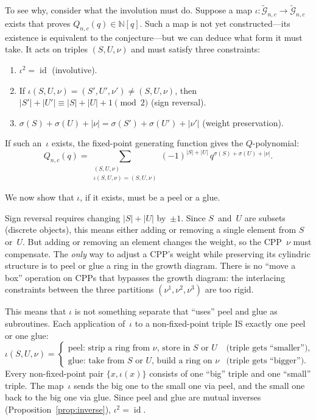 \documentclass[11pt]{article}
\newcommand{\N}{\mathbb{N}}
\theoremstyle{plain}
\theoremstyle{definition}
\begin{document}
To see why, consider what the involution must do.  Suppose a map
$\iota\colon \widetilde{\mathcal{G}}_{n,c} \to
\widetilde{\mathcal{G}}_{n,c}$ exists that proves
$Q_{n,c}(q) \in \N[q]$.  Such a map is not yet constructed---its
existence is equivalent to the conjecture---but we can deduce what
form it must take.  It acts on triples $(S, U, \nu)$ and must
satisfy three constraints:
\begin{enumerate}
  \item $\iota^2 = \operatorname{id}$ (involutive).
  \item If $\iota(S, U, \nu) = (S', U', \nu') \neq (S, U, \nu)$,
    then $|S'| + |U'| \equiv |S| + |U| + 1 \pmod{2}$
    (sign reversal).
  \item $\sigma(S) + \sigma(U) + |\nu|
    = \sigma(S') + \sigma(U') + |\nu'|$
    (weight preservation).
\end{enumerate}
If such an~$\iota$ exists, the fixed-point generating function
gives the $Q$-polynomial:
\begin{equation}\label{eq:fixed-points}
  Q_{n,c}(q) = \sum_{\substack{(S,U,\nu) \\
    \iota(S,U,\nu)=(S,U,\nu)}}
    (-1)^{|S|+|U|}\, q^{\sigma(S)+\sigma(U)+|\nu|}.
\end{equation}

\noindent
We now show that $\iota$, if it exists, must be a peel or a glue.

Sign reversal requires changing $|S| + |U|$ by~$\pm 1$.  Since
$S$~and~$U$ are subsets (discrete objects), this means either adding
or removing a single element from $S$ or~$U$.  But adding or
removing an element changes the weight, so the CPP~$\nu$ must
compensate.  The \emph{only} way to adjust a CPP's weight while
preserving its cylindric structure is to peel or glue a ring in the
growth diagram.  There is no ``move a box'' operation on CPPs that
bypasses the growth diagram: the interlacing constraints between the
three partitions $(\nu^1, \nu^2, \nu^3)$ are too rigid.

This means that $\iota$ is not something separate that ``uses''
peel and glue as subroutines.  Each application of~$\iota$ to a
non-fixed-point triple IS exactly one peel or one glue:
\[
  \iota(S, U, \nu) =
  \begin{cases}
    \text{peel: strip a ring from $\nu$, store in $S$ or $U$}
    & \text{(triple gets ``smaller''),} \\
    \text{glue: take from $S$ or $U$, build a ring on $\nu$}
    & \text{(triple gets ``bigger'').}
  \end{cases}
\]
Every non-fixed-point pair $\{x, \iota(x)\}$ consists of one
``big'' triple and one ``small'' triple.  The map~$\iota$ sends the
big one to the small one via peel, and the small one back to the big
one via glue.  Since peel and glue are mutual inverses
(Proposition~\ref{prop:inverse}), $\iota^2 = \operatorname{id}$.
\end{document}
